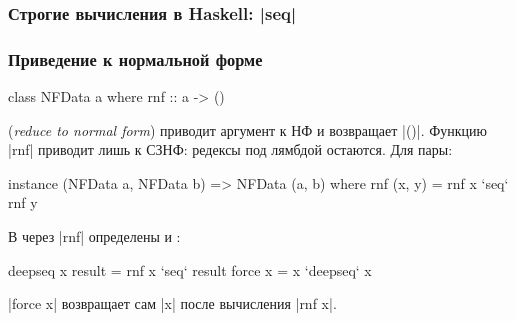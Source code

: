 \documentclass[11pt]{beamer}
\begin{document}
\begin{frame}[fragile]
  \frametitle{Строгие вычисления в Haskell: \haskinline|seq|}
\end{frame}

\begin{frame}[fragile]
  \frametitle{Приведение к нормальной форме}
  \small
  \begin{haskellsmall}
    class NFData a where
      rnf :: a -> ()
  \end{haskellsmall}
  \href{https://hackage.haskell.org/package/deepseq/docs/Control-DeepSeq.html#v:rnf}{} (\emph{reduce to normal form}) приводит аргумент к НФ и возвращает \haskinline|()|. Функцию \haskinline|rnf| приводит лишь к СЗНФ: редексы под лямбдой остаются.
  Для пары: \pause
  \begin{haskellsmall}
    instance (NFData a, NFData b) => NFData (a, b) where
      rnf (x, y) = rnf x `seq` rnf y
  \end{haskellsmall}
  В \href{https://hackage.haskell.org/package/deepseq/docs/Control-DeepSeq.html}{} через \haskinline|rnf| определены \href{https://hackage.haskell.org/package/deepseq/docs/Control-DeepSeq.html#v:deepseq}{} и \href{https://hackage.haskell.org/package/deepseq/docs/Control-DeepSeq.html#v:force}{}: \pause
  \begin{haskellsmall}
    deepseq x result = rnf x `seq` result
    force x = x `deepseq` x
  \end{haskellsmall}
  \haskinline|force x| возвращает сам \haskinline|x| после вычисления \haskinline|rnf x|.
\end{frame}
\end{document}
